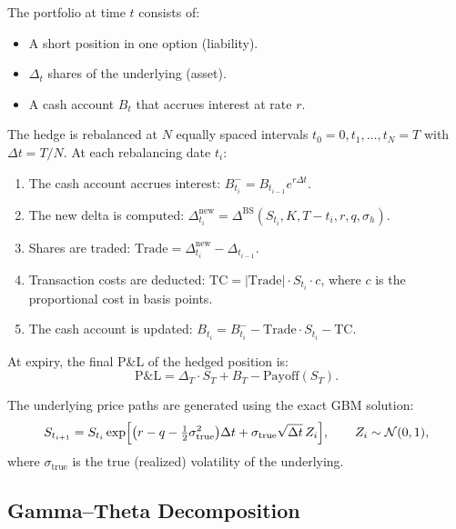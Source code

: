 \documentclass[11pt,a4paper]{article}
\newcommand{\bs}{\text{BS}}
\begin{document}
The portfolio at time $t$ consists of:
\begin{itemize}[nosep]
    \item A short position in one option (liability).
    \item $\Delta_t$ shares of the underlying (asset).
    \item A cash account $B_t$ that accrues interest at rate $r$.
\end{itemize}

The hedge is rebalanced at $N$ equally spaced intervals $t_0 = 0, t_1, \ldots, t_N = T$ with $\Delta t = T / N$. At each rebalancing date $t_i$:

\begin{enumerate}[nosep]
    \item The cash account accrues interest: $B_{t_i}^{-} = B_{t_{i-1}} e^{r \Delta t}$.
    \item The new delta is computed: $\Delta_{t_i}^{\text{new}} = \Delta^{\bs}(S_{t_i}, K, T - t_i, r, q, \sigma_h)$.
    \item Shares are traded: $\text{Trade} = \Delta_{t_i}^{\text{new}} - \Delta_{t_{i-1}}$.
    \item Transaction costs are deducted: $\text{TC} = |\text{Trade}| \cdot S_{t_i} \cdot c$, where $c$ is the proportional cost in basis points.
    \item The cash account is updated: $B_{t_i} = B_{t_i}^{-} - \text{Trade} \cdot S_{t_i} - \text{TC}$.
\end{enumerate}

At expiry, the final P\&L of the hedged position is:
\begin{equation}\label{eq:hedge_pnl}
    \text{P\&L} = \Delta_T \cdot S_T + B_T - \text{Payoff}(S_T).
\end{equation}

The underlying price paths are generated using the exact GBM solution:
\begin{equation}
    S_{t_{i+1}} = S_{t_i} \exp\Bigl[\bigl(r - q - \tfrac{1}{2}\sigma_{\text{true}}^2\bigr)\Delta t + \sigma_{\text{true}} \sqrt{\Delta t} \, Z_i\Bigr], \qquad Z_i \sim \mathcal{N}(0,1),
\end{equation}
where $\sigma_{\text{true}}$ is the true (realized) volatility of the underlying.


\subsection{Gamma--Theta Decomposition}\label{subsec:gamma_theta}
\end{document}
